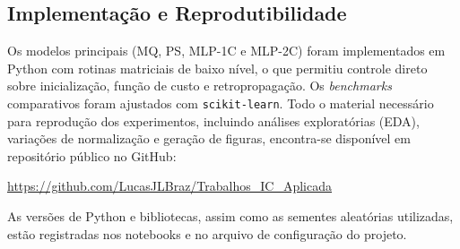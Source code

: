 \begin{table}[h]
\centering
\caption{Modelos e hiperparâmetros selecionados.}
\label{tab:modelos_hiperparam}
\end{table}


\subsection{Implementação e Reprodutibilidade}
\label{sec:implementacao_reprodutibilidade}

Os modelos principais (MQ, PS, MLP-1C e MLP-2C) foram implementados em Python com rotinas matriciais de baixo nível, o que permitiu controle direto sobre inicialização, função de custo e retropropagação. Os \emph{benchmarks} comparativos foram ajustados com \texttt{scikit-learn}. Todo o material necessário para reprodução dos experimentos, incluindo análises exploratórias (EDA), variações de normalização e geração de figuras, encontra-se disponível em repositório público no GitHub:
\begin{center}
    \url{https://github.com/LucasJLBraz/Trabalhos_IC_Aplicada}
\end{center}
As versões de Python e bibliotecas, assim como as sementes aleatórias utilizadas, estão registradas nos notebooks e no arquivo de configuração do projeto.

